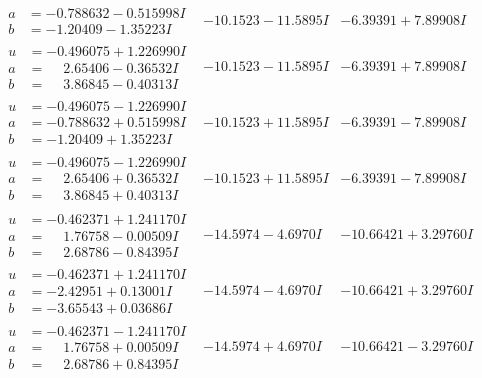 \documentclass[1p]{elsarticle_modified}
\theoremstyle{definition}
\begin{document}
$$\begin{array}{c|c|c}
\begin{aligned}
a &= -0.788632 - 0.515998 I \\
b &= -1.20409 - 1.35223 I\end{aligned}
 & -10.1523 - 11.5895 I & -6.39391 + 7.89908 I \\ \hline\begin{aligned}
u &= -0.496075 + 1.226990 I \\
a &= \phantom{-}2.65406 - 0.36532 I \\
b &= \phantom{-}3.86845 - 0.40313 I\end{aligned}
 & -10.1523 - 11.5895 I & -6.39391 + 7.89908 I \\ \hline\begin{aligned}
u &= -0.496075 - 1.226990 I \\
a &= -0.788632 + 0.515998 I \\
b &= -1.20409 + 1.35223 I\end{aligned}
 & -10.1523 + 11.5895 I & -6.39391 - 7.89908 I \\ \hline\begin{aligned}
u &= -0.496075 - 1.226990 I \\
a &= \phantom{-}2.65406 + 0.36532 I \\
b &= \phantom{-}3.86845 + 0.40313 I\end{aligned}
 & -10.1523 + 11.5895 I & -6.39391 - 7.89908 I \\ \hline\begin{aligned}
u &= -0.462371 + 1.241170 I \\
a &= \phantom{-}1.76758 - 0.00509 I \\
b &= \phantom{-}2.68786 - 0.84395 I\end{aligned}
 & -14.5974 - 4.6970 I & -10.66421 + 3.29760 I \\ \hline\begin{aligned}
u &= -0.462371 + 1.241170 I \\
a &= -2.42951 + 0.13001 I \\
b &= -3.65543 + 0.03686 I\end{aligned}
 & -14.5974 - 4.6970 I & -10.66421 + 3.29760 I \\ \hline\begin{aligned}
u &= -0.462371 - 1.241170 I \\
a &= \phantom{-}1.76758 + 0.00509 I \\
b &= \phantom{-}2.68786 + 0.84395 I\end{aligned}
 & -14.5974 + 4.6970 I & -10.66421 - 3.29760 I \\ \hline\begin{aligned}

\end{aligned}
\end{array}$$
\end{document}
